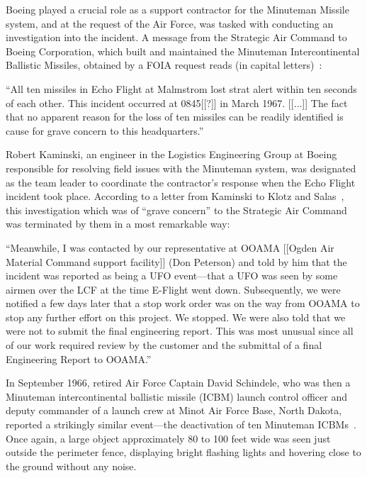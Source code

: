 Boeing played a crucial role as a support contractor for the Minuteman Missile system,
and at the request of the Air Force, was tasked with conducting an investigation into the incident.
A message from the Strategic Air Command to Boeing Corporation, which built and maintained the Minuteman Intercontinental Ballistic Missiles,
obtained by a FOIA request reads (in capital letters)~\cite{Klotz-Salas-1996}:
\begin{svgraybox}
``All ten missiles in Echo Flight at Malmstrom lost strat alert within ten seconds of each other. This incident occurred at 0845[[?]] in March 1967. [[$\ldots$]] The fact that no apparent reason for the loss of ten missiles can be readily identified is cause for grave concern to this headquarters.''
\end{svgraybox}






Robert Kaminski, an engineer in the Logistics Engineering Group at Boeing responsible for resolving field issues with the Minuteman system,
was designated as the team leader to coordinate the contractor's response when the Echo Flight incident took place.
According to a letter from Kaminski to Klotz and Salas~\cite[p.~21]{Klotz2005Feb}, this investigation
which was of ``grave concern'' to the Strategic Air Command was terminated by them
in a most remarkable way:
\begin{svgraybox}
``Meanwhile, I was contacted by our representative at OOAMA [[Ogden
Air Material Command support facility]] (Don Peterson) and told by
him that the incident was reported as being a UFO event---that a UFO
was seen by some airmen over the LCF at the time E-Flight went down.
Subsequently, we were notified a few days later that a stop work order
was on the way from OOAMA to stop any further effort on this project.
We stopped. We were also told that we were not to submit the final
engineering report. This was most unusual since all of our work
required review by the customer and the submittal of a final
Engineering Report to OOAMA.''
\end{svgraybox}

In September 1966, retired Air Force Captain David Schindele, who was then a Minuteman intercontinental ballistic missile (ICBM) launch control officer and deputy commander of a launch crew at Minot Air Force Base, North Dakota, reported a strikingly similar event---the deactivation of ten Minuteman ICBMs~\cite{Schindele2016Feb,Schindele2017May}. Once again, a large object approximately 80 to 100 feet wide was seen just outside the perimeter fence, displaying bright flashing lights and hovering close to the ground without any noise.

